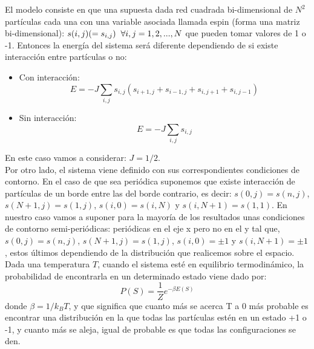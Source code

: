 \documentclass[12pt,paper]{article}
\begin{document}
El modelo consiste en que una supuesta dada red cuadrada bi-dimensional de $N^2$ partículas cada una con una variable asociada llamada espin (forma una matriz bi-dimensional): $s(i,j) (= s_{i,j}) \hspace{2mm} \forall i,j=1,2,...,N$ que pueden tomar valores de 1 o -1. Entonces la energía del sistema será diferente dependiendo de si existe interacción entre partículas o no:
\begin{itemize}
    \item Con interacción:
    \begin{equation}
        E = -J \sum_{i,j} s_{i,j}(s_{i+1,j}+s_{i-1,j}+s_{i,j+1}+s_{i,j-1})
    \end{equation}
    \item Sin interacción:
    \begin{equation}
        E = -J \sum_{i,j} s_{i,j}
    \end{equation}
\end{itemize}
En este caso vamos a considerar: $J=1/2$.\\

Por otro lado, el sistema viene definido con sus correspondientes condiciones de contorno. En el caso de que sea periódica suponemos que existe interacción de partículas de un borde entre las del borde contrario, es decir: $s(0,j)=s(n,j)$, $s(N+1,j)=s(1,j)$, $s(i,0)=s(i,N)$ y $s(i,N+1)=s(1,1)$. En nuestro caso vamos a suponer para la mayoría de los resultados unas condiciones de contorno semi-periódicas: periódicas en el eje x pero no en el y tal que, $s(0,j)=s(n,j)$, $s(N+1,j)=s(1,j)$, $s(i,0)= \pm 1$ y $s(i,N+1)=\pm 1$, estos últimos dependiendo de la distribución que realicemos sobre el espacio.\\

Dada una temperatura $T$, cuando el sistema esté en equilibrio termodinámico, la probabilidad de encontrarla en un determinado estado viene dado por:
\begin{equation}
    P(S) = \frac{1}{Z}e^{-\beta E(S)}
\end{equation}
donde $\beta = 1/k_BT$, y que significa que cuanto más se acerca T a 0 más probable es encontrar una distribución en la que todas las partículas estén en un estado +1 o -1, y cuanto más se aleja, igual de probable es que todas las configuraciones se den.\\
\end{document}
